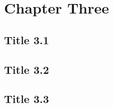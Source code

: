 \section{Chapter Three}
\subsection{Title 3.1}
\lipsum[1]

\subsection{Title 3.2}
\lipsum[2]

\subsection{Title 3.3}
\lipsum[3]